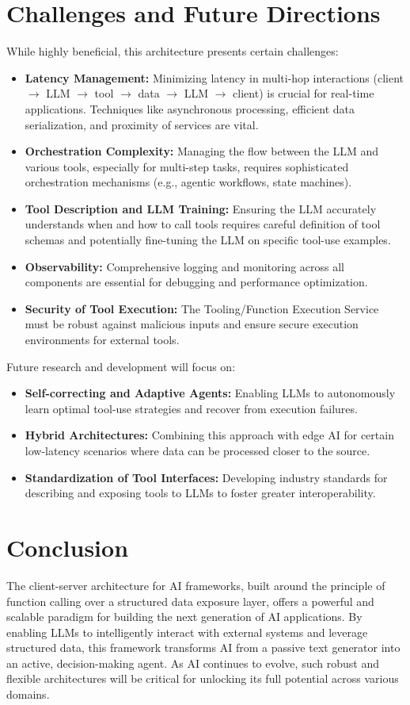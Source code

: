 \documentclass[10pt, a4paper]{article}
\begin{document}
\section{Challenges and Future Directions}
While highly beneficial, this architecture presents certain challenges:
\begin{itemize}
    \item \textbf{Latency Management:} Minimizing latency in multi-hop interactions (client $\rightarrow$ LLM $\rightarrow$ tool $\rightarrow$ data $\rightarrow$ LLM $\rightarrow$ client) is crucial for real-time applications. Techniques like asynchronous processing, efficient data serialization, and proximity of services are vital.
    \item \textbf{Orchestration Complexity:} Managing the flow between the LLM and various tools, especially for multi-step tasks, requires sophisticated orchestration mechanisms (e.g., agentic workflows, state machines).
    \item \textbf{Tool Description and LLM Training:} Ensuring the LLM accurately understands when and how to call tools requires careful definition of tool schemas and potentially fine-tuning the LLM on specific tool-use examples.
    \item \textbf{Observability:} Comprehensive logging and monitoring across all components are essential for debugging and performance optimization.
    \item \textbf{Security of Tool Execution:} The Tooling/Function Execution Service must be robust against malicious inputs and ensure secure execution environments for external tools.
\end{itemize}
Future research and development will focus on:
\begin{itemize}
    \item \textbf{Self-correcting and Adaptive Agents:} Enabling LLMs to autonomously learn optimal tool-use strategies and recover from execution failures.
    \item \textbf{Hybrid Architectures:} Combining this approach with edge AI for certain low-latency scenarios where data can be processed closer to the source.
    \item \textbf{Standardization of Tool Interfaces:} Developing industry standards for describing and exposing tools to LLMs to foster greater interoperability.
\end{itemize}

\section{Conclusion}
The client-server architecture for AI frameworks, built around the principle of function calling over a structured data exposure layer, offers a powerful and scalable paradigm for building the next generation of AI applications. By enabling LLMs to intelligently interact with external systems and leverage structured data, this framework transforms AI from a passive text generator into an active, decision-making agent. As AI continues to evolve, such robust and flexible architectures will be critical for unlocking its full potential across various domains.
\end{document}
